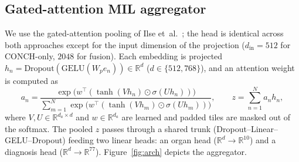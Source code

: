 \documentclass[11pt,a4paper]{article}
\begin{document}
\subsection{Gated-attention MIL aggregator}
We use the gated-attention pooling of Ilse et~al.\ \cite{ilse2018attention}; the head is identical
across both approaches except for the input dimension of the projection
($d_{\text{in}}=512$ for CONCH-only, $2048$ for fusion). Each embedding is
projected $h_n = \text{Dropout}(\text{GELU}(W_p e_n)) \in \mathbb{R}^{d}$ ($d\in\{512,768\}$),
and an attention weight is computed as
\begin{equation}
a_n = \frac{\exp\!\big(w^\top (\tanh(V h_n)\odot\sigma(U h_n))\big)}
           {\sum_{m=1}^{N}\exp\!\big(w^\top (\tanh(V h_m)\odot\sigma(U h_m))\big)},
\qquad z = \sum_{n=1}^{N} a_n h_n ,
\end{equation}
where $V,U \in \mathbb{R}^{d_a\times d}$ and $w\in\mathbb{R}^{d_a}$ are learned and padded tiles
are masked out of the softmax. The pooled $z$ passes through a shared trunk
(Dropout--Linear--GELU--Dropout) feeding two linear heads: an organ head
($\mathbb{R}^{d}\!\to\!\mathbb{R}^{10}$) and a diagnosis head
($\mathbb{R}^{d}\!\to\!\mathbb{R}^{77}$). Figure~\ref{fig:arch} depicts the aggregator.
\end{document}
